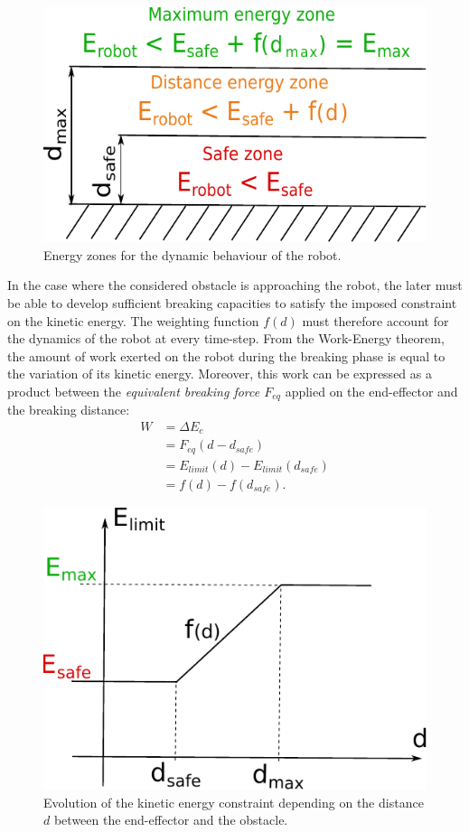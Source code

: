 \documentclass[a4paper, 10pt, conference]{ieeeconf}      %
\begin{document}
\begin{figure}[h]
\centering
\includegraphics[width=0.8\columnwidth]{figures/niveauEnergie_dessin}
\caption{Energy zones for the dynamic behaviour of the robot.} 
\label{fig:niveauEnergie1}
\end{figure}

In the case where the considered obstacle is approaching the robot, the later must be able to develop sufficient breaking capacities to satisfy the imposed constraint on the kinetic energy. The weighting function $f(d)$ must therefore account for the dynamics of the robot at every time-step. From the Work-Energy theorem, the amount of work exerted on the robot during the breaking phase is equal to the variation of its kinetic energy. Moreover, this work can be expressed as a product between the \textit{equivalent breaking force $F_{eq}$} applied on the end-effector and the breaking distance:
\begin{equation}
\begin{split}
W &= \Delta E_c 
\\
&= F_{eq} (d-d_{safe}) 
\\
&= E_{limit}(d) - E_{limit}(d_{safe}) 
\\
&= f(d) - f(d_{safe}).
\end{split}
\end{equation}

\begin{figure}
    \centering
	\includegraphics[width=0.8\columnwidth]{figures/niveauEnergie_graph2}
    \caption{Evolution of the kinetic energy constraint depending on the distance $d$ between the end-effector and the obstacle.}
    \label{fig:niveauEnergie2}
\end{figure}
\end{document}

